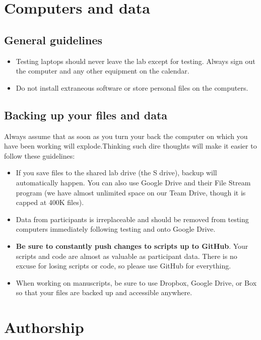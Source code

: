 \documentclass[letterpaper,11pt,oneside]{memoir}
\begin{document}
\section{Computers and data}

\subsection{General guidelines}

\begin{itemize}
\item Testing laptops should never leave the lab except for testing. Always sign out the computer and any other equipment on the calendar.
\item Do not install extraneous software or store personal files on the computers.
\end{itemize}

\subsection{Backing up your files and data}

Always assume that as soon as you turn your back the computer on which you have been working will explode.Thinking such dire thoughts will make it easier to follow these guidelines:

\begin{itemize}
\item If you save files to the shared lab drive (the S drive), backup will automatically happen. You can also use Google Drive and their File Stream program (we have almost unlimited space on our Team Drive, though it is capped at 400K files). 
\item Data from participants is irreplaceable and should be removed from testing computers immediately following testing and onto Google Drive.
\item \textbf{Be sure to constantly push changes to scripts up to GitHub}. Your scripts and code are almost as valuable as participant data. There is no excuse for losing scripts or code, so please use GitHub for everything.
\item When working on manuscripts, be sure to use Dropbox, Google Drive, or Box so that your files are backed up and accessible anywhere.
\end{itemize}


\section{Authorship}
\label{sec:authorship}
\end{document}

